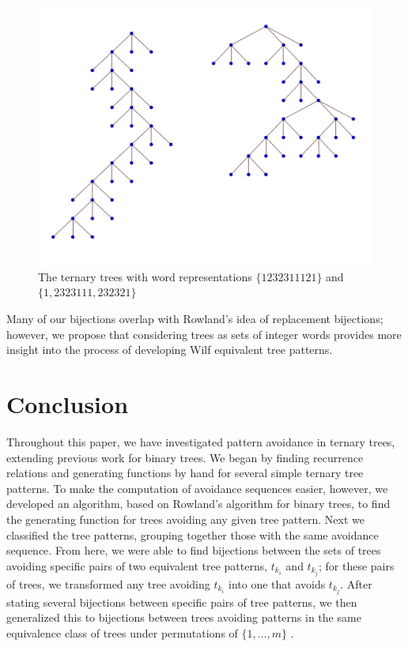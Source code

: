 \documentclass[12pt]{article}
\begin{document}
\begin{figure}[bht]
\begin{center}
\includegraphics{non_replacement}
\end{center}
\caption{The ternary trees with word representations $\{1232311121\}$ and $\{1, \allowbreak 2323111, \allowbreak 232321\}$}
\label{nonreplace}
\end{figure}

Many of our bijections overlap with Rowland's idea of replacement bijections; however, we propose that considering trees as sets of integer words provides more insight into the process of developing Wilf equivalent tree patterns.

\section{Conclusion}

Throughout this paper, we have investigated pattern avoidance in ternary trees, extending previous work for binary trees.  We began by finding recurrence relations and generating functions by hand for several simple ternary tree patterns.  To make the computation of avoidance sequences easier, however, we developed an algorithm, based on Rowland's algorithm for binary trees, to find the generating function for trees avoiding any given tree pattern.  Next we classified the tree patterns, grouping together those with the same avoidance sequence. From here, we were able to find bijections between the sets of trees avoiding specific pairs of two equivalent tree patterns, $t_{k_i}$ and $t_{k_j}$; for these pairs of trees, we transformed any tree avoiding $t_{k_i}$ into one that avoids $t_{k_j}$.  After stating several bijections between specific pairs of tree patterns, we then generalized this to bijections between trees avoiding patterns in the same equivalence class of trees under permutations of $\{1, \dots, m\}$ .
\end{document}
